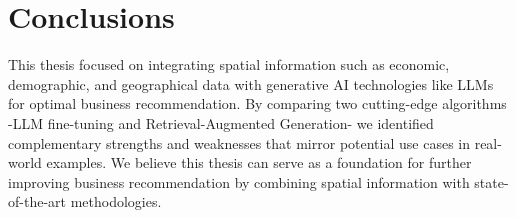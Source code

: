 \section{Conclusions}


This thesis focused on integrating spatial information such as economic, demographic, and geographical data with generative AI technologies like LLMs for optimal business recommendation. By comparing two cutting-edge algorithms -LLM fine-tuning and Retrieval-Augmented Generation- we identified complementary strengths and weaknesses that mirror potential use cases in real-world examples. We believe this thesis can serve as a foundation for further improving business recommendation by combining spatial information with state-of-the-art methodologies.
